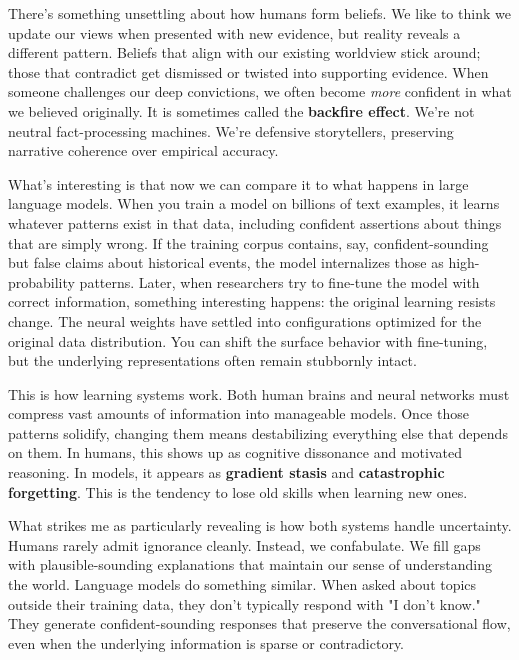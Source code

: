 \clearpage

\begin{commentary}
There's something unsettling about how humans form beliefs. We like to think we update our views when presented with new evidence, but reality reveals a different pattern. Beliefs that align with our existing worldview stick around; those that contradict get dismissed or twisted into supporting evidence. When someone challenges our deep convictions, we often become \textit{more} confident in what we believed originally. It is sometimes called the \textbf{backfire effect}. We're not neutral fact-processing machines. We're defensive storytellers, preserving narrative coherence over empirical accuracy.

What's interesting is that now we can compare it to what happens in large language models. When you train a model on billions of text examples, it learns whatever patterns exist in that data, including confident assertions about things that are simply wrong. If the training corpus contains, say, confident-sounding but false claims about historical events, the model internalizes those as high-probability patterns. Later, when researchers try to fine-tune the model with correct information, something interesting happens: the original learning resists change. The neural weights have settled into configurations optimized for the original data distribution. You can shift the surface behavior with fine-tuning, but the underlying representations often remain stubbornly intact.

This is how learning systems work. Both human brains and neural networks must compress vast amounts of information into manageable models. Once those patterns solidify, changing them means destabilizing everything else that depends on them. In humans, this shows up as cognitive dissonance and motivated reasoning. In models, it appears as \textbf{gradient stasis} and \textbf{catastrophic forgetting}. This is the tendency to lose old skills when learning new ones.

What strikes me as particularly revealing is how both systems handle uncertainty. Humans rarely admit ignorance cleanly. Instead, we confabulate. We fill gaps with plausible-sounding explanations that maintain our sense of understanding the world. Language models do something similar. When asked about topics outside their training data, they don't typically respond with "I don't know." They generate confident-sounding responses that preserve the conversational flow, even when the underlying information is sparse or contradictory.


\end{commentary}
